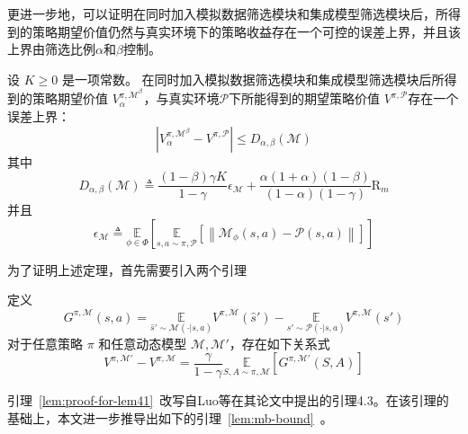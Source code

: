更进一步地，可以证明在同时加入模拟数据筛选模块和集成模型筛选模块后，所得到的策略期望价值仍然与真实环境下的策略收益存在一个可控的误差上界，并且该上界由筛选比例$\alpha$和$\beta$控制。

\begin{theorem}\label{the:MBDP-bound}

设 $K\geq 0$ 是一项常数。 在同时加入模拟数据筛选模块和集成模型筛选模块后所得到的策略期望价值 ${V}_\alpha^{\pi, \mathcal{M}^\beta}$，与真实环境$\mathcal{P}$下所能得到的期望策略价值 ${V}^{\pi, \mathcal{P}}$存在一个误差上界：
\begin{equation}
\left|{V}_\alpha^{\pi, \mathcal{M}^\beta}-{V}^{\pi, \mathcal{P}}\right|\leq D_{\alpha,\beta}(\mathcal{M})
\end{equation}
其中
\begin{equation}\label{eq:MBDP-bound}
D_{\alpha,\beta}(\mathcal{M})\triangleq\frac{(1-\beta)\gamma K}{1-\gamma}\epsilon_{\mathcal{M}}+\frac{\alpha(1+\alpha)(1-\beta)}{(1-\alpha)(1-\gamma)}\mathrm{R}_m
\end{equation}
并且
\begin{equation}\label{def:delta-M}
\epsilon_{\mathcal{M}}\triangleq\underset{\phi\in\Phi}{\mathbb{E}}\left[\underset{s,a\sim \pi,\mathcal{P}}{\mathbb{E}}\left[\left\|\mathcal{M}_\phi(s, a)-\mathcal{P}(s, a)\right\|\right]\right]
\end{equation}

\end{theorem}
为了证明上述定理，首先需要引入两个引理

\begin{lemma}\label{lem:proof-for-lem41}
定义
\begin{equation}\label{def:G-sa}
G^{\pi,\mathcal{M}}(s,a)=\underset{\hat{s}'\sim\mathcal{M}(\cdot|s,a)}{\mathbb{E}}{{V}^{\pi,\mathcal{M}}}(\hat{s}') - \underset{s'\sim\mathcal{P}(\cdot|s,a)}{\mathbb{E}}{{V}^{\pi,\mathcal{M}}}(s')
\end{equation}
对于任意策略 $\pi$ 和任意动态模型 $\mathcal{M},\mathcal{M}'$，存在如下关系式
\begin{equation}
{V}^{\pi,\mathcal{M}'} - {V}^{\pi,\mathcal{M}} = \frac{\gamma}{1-\gamma}\underset{S,A\sim\pi,\mathcal{M}}{\mathbb{E}}\left[G^{\pi,\mathcal{M}'}(S,A)\right]
\end{equation}
\end{lemma}

引理~\ref{lem:proof-for-lem41}~改写自Luo等\cite{luo2018algorithmic}在其论文中提出的引理4.3。在该引理的基础上，本文进一步推导出如下的引理~\ref{lem:mb-bound}~。

